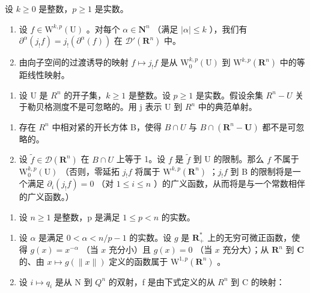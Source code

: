 设 \(k \geqslant 0\) 是整数，\(p \geqslant 1\) 是实数。

\begin{enumerate}
\def\labelenumi{\alph{enumi})}
\item
  设 \(f \in \mathrm{W}^{k,p}(\mathrm{U})\) 。对每个 \(\alpha \in \mathbf{N}^n\) （满足 \(|\alpha| \leqslant k\) ），我们有 \(\partial^\alpha(j_{!}f) = j_{!}(\partial^\alpha(f))\) 在 \(\mathcal{D}'(\mathbf{R}^n)\) 中。
\item
  由向子空间的过渡诱导的映射 \(f \mapsto j_{!}f\) 是从 \(\mathrm{W}_{0}^{k,p}(\mathrm{U})\) 到 \(\mathrm{W}^{k,p}(\mathbf{R}^{n})\) 中的等距线性映射。
\end{enumerate}

\begin{enumerate}
\def\labelenumi{\arabic{enumi})}
\setcounter{enumi}{13}
\tightlist
\item
  设 U 是 \(R^{n}\) 的开子集，\(k \geqslant 1\) 是整数。设 \(p \geqslant 1\) 是实数。假设余集 \(R^{n} - U\) 关于勒贝格测度不是可忽略的。用 j 表示 U 到 \(R^{n}\) 中的典范单射。
\end{enumerate}

\begin{enumerate}
\def\labelenumi{\alph{enumi})}
\item
  存在 \(R^{n}\) 中相对紧的开长方体 B，使得 \(B \cap U\) 与 \(B \cap (\mathbf{R}^{n} - \mathbf{U})\) 都不是可忽略的。
\item
  设 \(\widetilde{f} \in \mathcal{D}(\mathbf{R}^n)\) 在 \(B \cap U\) 上等于 1。设 \(f\) 是 \(\widetilde{f}\) 到 U 的限制。那么 \(f\) 不属于 \(\mathrm{W}_0^{k,p}(\mathrm{U})\) （否则，零延拓 \(j_{!}f\) 将属于 \(\mathrm{W}^{k,p}(\mathbf{R}^n)\) ；\(j_{!}f\) 到 B 的限制将是一个满足 \(\partial_i(j_{!}f) = 0\) （对 \(1 \leqslant i \leqslant n\) ）的广义函数，从而将是与一个常数相伴的广义函数。）
\end{enumerate}

\begin{enumerate}
\def\labelenumi{\arabic{enumi})}
\setcounter{enumi}{14}
\tightlist
\item
  设 \(n \geqslant 1\) 是整数，p 是满足 \(1 \leqslant p < n\) 的实数。
\end{enumerate}

\begin{enumerate}
\def\labelenumi{\alph{enumi})}
\item
  设 \(\alpha\) 是满足 \(0 < \alpha < n/p - 1\) 的实数。设 \(g\) 是 \(\mathbf{R}_{+}^{*}\) 上的无穷可微正函数，使得 \(g(x) = x^{-\alpha}\) （当 \(x\) 充分小）且 \(g(x) = 0\) （当 \(x\) 充分大）；从 \(\mathbf{R}^{n}\) 到 \(\mathbf{C}\) 的、由 \(x \mapsto g(\|x\|)\) 定义的函数属于 \(\mathrm{W}^{1,p}(\mathbf{R}^{n})\) 。
\item
  设 \(i \mapsto q_{i}\) 是从 N 到 \(Q^{n}\) 的双射，f 是由下式定义的从 \(R^{n}\) 到 C 的映射：
\end{enumerate}


